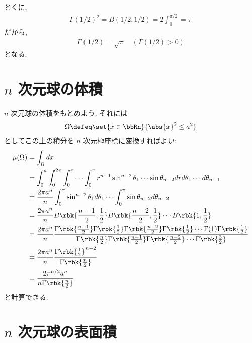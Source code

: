 \documentclass[openany, a4paper, oneside]{jsbook}
\begin{document}
とくに,
\begin{align}
 \Gamma(1/2)^2
 =
 B(1/2, 1/2)
 =
 2\int_0^{\pi / 2}
 =
 \pi
\end{align}
だから,
\begin{align}
 \Gamma(1/2)
 =
 \sqrt{\pi} \quad (\Gamma(1/2) > 0)
\end{align}
となる.
\section{$n$ 次元球の体積}

\begin{ex}[$n$ 次元球の体積]
$n$ 次元球の体積をもとめよう.
それには
\begin{align}
 \Omega
 \defeq
 \set{x \in \bbRn}{\abs{x}^2 \le a^2}
\end{align}
としてこの上の積分を $n$ 次元極座標に変換すればよい:
\begin{align}
 \mu(\Omega)
 &=
 \int_{\Omega}dx \\
 &=
 \int_0^a\int_0^{2\pi} \int_0^{\pi} \cdots \int_0^{\pi} r^{n-1}\sin^{n-2} \theta_1
  \cdots \sin \theta_{n-2} drd\theta_1 \cdots d\theta_{n-1} \\
 &=
 \frac{2\pi a^n}{n} \int_0^{\pi} \sin^{n-2}\theta_1d\theta_1
  \cdots  \int_0^{\pi} \sin \theta_{n-2}d\theta_{n-2} \\
 &=
 \frac{2\pi a^n}{n} B\rbk{\frac{n-1}{2}, \frac{1}{2}} B\rbk{\frac{n-2}{2}, \frac{1}{2}}
  \cdots B \rbk{1, \frac{1}{2}} \\
 &=
 \frac{2\pi a^n}{n}
  \frac{\Gamma \rbk{\frac{n-1}{2}} \Gamma \rbk{\frac{1}{2}} \Gamma \rbk{\frac{n-2}{2}} \Gamma \rbk{\frac{1}{2}}
  \cdots \Gamma(1) \Gamma \rbk{\frac{1}{2}}}
  {\Gamma \rbk{\frac{n}{2}} \Gamma \rbk{\frac{n-1}{2}} \Gamma \rbk{\frac{n-2}{2}} \cdots \Gamma \rbk{\frac{3}{2}}} \\
 &=
 \frac{2\pi a^n}{n}
  \frac{\Gamma \rbk{\frac{1}{2}}^{n-2}}{\Gamma \rbk{\frac{n}{2}}} \\
 &=
 \frac{2\pi^{n/2} a^n}{n \Gamma \rbk{\frac{n}{2}}}
\end{align}
と計算できる.
\end{ex}
\section{$n$ 次元球の表面積}
\end{document}
